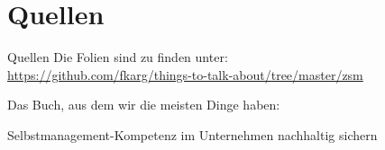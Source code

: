 \section{Quellen}
\begin{frame}{Quellen}
    Die Folien sind zu finden unter: \\
    \url{https://github.com/fkarg/things-to-talk-about/tree/master/zsm}

	\hspace{2cm}

    Das Buch, aus dem wir die meisten Dinge haben:

    \begin{thebibliography}{10}
    \beamertemplatebookbibitems
        Selbstmanagement-Kompetenz im Unternehmen nachhaltig sichern

    \newpage


\end{thebibliography}
\end{frame}
